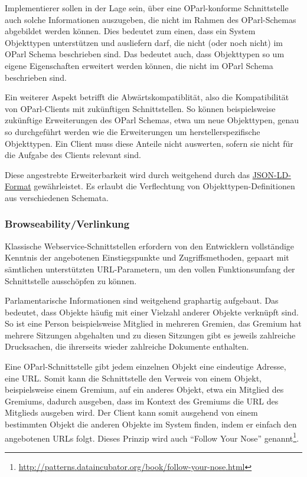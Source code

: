 \documentclass[,a4paper]{article}
\begin{document}

Implementierer sollen in der Lage sein, über eine OParl-konforme
Schnittstelle auch solche Informationen auszugeben, die nicht im Rahmen
des OParl-Schemas abgebildet werden können. Dies bedeutet zum einen,
dass ein System Objekttypen unterstützen und ausliefern darf, die nicht
(oder noch nicht) im OParl Schema beschrieben sind. Das bedeutet auch,
dass Objekttypen so um eigene Eigenschaften erweitert werden können, die
nicht im OParl Schema beschrieben sind.

Ein weiterer Aspekt betrifft die Abwärtskompatiblität, also die
Kompatibilität von OParl-Clients mit zukünftigen Schnittstellen. So
können beispielsweise zukünftige Erweiterungen des OParl Schemas, etwa
um neue Objekttypen, genau so durchgeführt werden wie die Erweiterungen
um herstellerspezifische Objekttypen. Ein Client muss diese Anteile
nicht auswerten, sofern sie nicht für die Aufgabe des Clients relevant
sind.

Diese angestrebte Erweiterbarkeit wird durch weitgehend durch das
\hyperref[jsonld]{JSON-LD-Format} gewährleistet. Es erlaubt die
Verflechtung von Objekttypen-Definitionen aus verschiedenen Schemata.

\subsubsection{Browseability/Verlinkung}\label{browseabilityux5fverlinkung}

Klassische Webservice-Schnittstellen erfordern von den Entwicklern
vollständige Kenntnis der angebotenen Einstiegspunkte und
Zugriffsmethoden, gepaart mit sämtlichen unterstützten URL-Parametern,
um den vollen Funktionsumfang der Schnittstelle ausschöpfen zu können.

Parlamentarische Informationen sind weitgehend graphartig aufgebaut. Das
bedeutet, dass Objekte häufig mit einer Vielzahl anderer Objekte
verknüpft sind. So ist eine Person beispielsweise Mitglied in mehreren
Gremien, das Gremium hat mehrere Sitzungen abgehalten und zu diesen
Sitzungen gibt es jeweils zahlreiche Drucksachen, die ihrerseits wieder
zahlreiche Dokumente enthalten.

Eine OParl-Schnittstelle gibt jedem einzelnen Objekt eine eindeutige
Adresse, eine URL. Somit kann die Schnittstelle den Verweis von einem
Objekt, beispielsweise einem Gremium, auf ein anderes Objekt, etwa ein
Mitglied des Gremiums, dadurch ausgeben, dass im Kontext des Gremiums
die URL des Mitglieds ausgeben wird. Der Client kann somit ausgehend von
einem bestimmten Objekt die anderen Objekte im System finden, indem er
einfach den angebotenen URLs folgt. Dieses Prinzip wird auch ``Follow
Your Nose'' genannt\footnote{\url{http://patterns.dataincubator.org/book/follow-your-nose.html}}.
\end{document}
